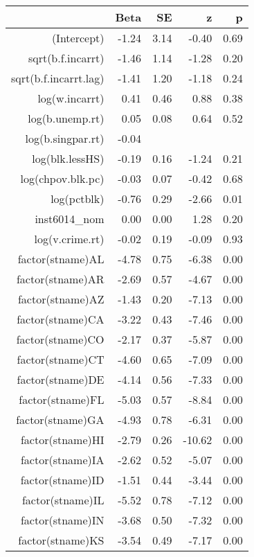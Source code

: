\begin{table}[ht]
\centering
\begin{tabular}{rrrrr}
  \hline
 & Beta & SE & z & p \\ 
  \hline
(Intercept) & -1.24 & 3.14 & -0.40 & 0.69 \\ 
  sqrt(b.f.incarrt) & -1.46 & 1.14 & -1.28 & 0.20 \\ 
  sqrt(b.f.incarrt.lag) & -1.41 & 1.20 & -1.18 & 0.24 \\ 
  log(w.incarrt) & 0.41 & 0.46 & 0.88 & 0.38 \\ 
  log(b.unemp.rt) & 0.05 & 0.08 & 0.64 & 0.52 \\ 
  log(b.singpar.rt) & -0.04 &  &  &  \\ 
  log(blk.lessHS) & -0.19 & 0.16 & -1.24 & 0.21 \\ 
  log(chpov.blk.pc) & -0.03 & 0.07 & -0.42 & 0.68 \\ 
  log(pctblk) & -0.76 & 0.29 & -2.66 & 0.01 \\ 
  inst6014\_nom & 0.00 & 0.00 & 1.28 & 0.20 \\ 
  log(v.crime.rt) & -0.02 & 0.19 & -0.09 & 0.93 \\ 
  factor(stname)AL & -4.78 & 0.75 & -6.38 & 0.00 \\ 
  factor(stname)AR & -2.69 & 0.57 & -4.67 & 0.00 \\ 
  factor(stname)AZ & -1.43 & 0.20 & -7.13 & 0.00 \\ 
  factor(stname)CA & -3.22 & 0.43 & -7.46 & 0.00 \\ 
  factor(stname)CO & -2.17 & 0.37 & -5.87 & 0.00 \\ 
  factor(stname)CT & -4.60 & 0.65 & -7.09 & 0.00 \\ 
  factor(stname)DE & -4.14 & 0.56 & -7.33 & 0.00 \\ 
  factor(stname)FL & -5.03 & 0.57 & -8.84 & 0.00 \\ 
  factor(stname)GA & -4.93 & 0.78 & -6.31 & 0.00 \\ 
  factor(stname)HI & -2.79 & 0.26 & -10.62 & 0.00 \\ 
  factor(stname)IA & -2.62 & 0.52 & -5.07 & 0.00 \\ 
  factor(stname)ID & -1.51 & 0.44 & -3.44 & 0.00 \\ 
  factor(stname)IL & -5.52 & 0.78 & -7.12 & 0.00 \\ 
  factor(stname)IN & -3.68 & 0.50 & -7.32 & 0.00 \\ 
  factor(stname)KS & -3.54 & 0.49 & -7.17 & 0.00 \\ 

\end{tabular}
\end{table}
